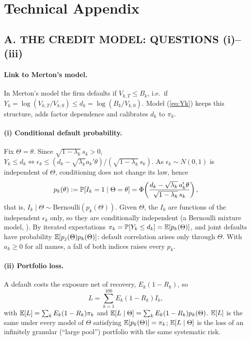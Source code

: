 \appendix
\section*{Technical Appendix}

\subsection*{A. THE CREDIT MODEL: QUESTIONS (i)--(iii)}
\paragraph{Link to Merton's model.}
In Merton's model \citep[Ch.~2]{DeGiorgi26} the firm defaults if $V_{k,T}\le B_k$, i.e.\ if $Y_k=\log(V_{k,T}/V_{k,0})\le d_k=\log(B_k/V_{k,0})$. Model (\ref{eq:Yk}) keeps this structure, adds factor dependence \citep[Sect.~8.3]{McNeil05} and calibrates $d_k$ to $\pi_k$.

\paragraph{(i) Conditional default probability.}
Fix $\Theta=\theta$. Since $\sqrt{1-\lambda_k}\,s_k>0$, $Y_k\le d_k\iff\epsilon_k\le(d_k-\sqrt{\lambda_k}a_k'\theta)/(\sqrt{1-\lambda_k}\,s_k)$. As $\epsilon_k\sim N(0,1)$ is independent of $\Theta$, conditioning does not change its law, hence
\begin{equation}
\label{eq:condpd}
p_k(\theta):=\P[I_k=1\mid\Theta=\theta]=\Phi\!\left(\frac{d_k-\sqrt{\lambda_k}\,a_k'\theta}{\sqrt{1-\lambda_k}\,s_k}\right),
\end{equation}
that is, $I_k\mid\Theta\sim\mathrm{Bernoulli}(p_k(\Theta))$.
Given $\Theta$, the $I_k$ are functions of the independent $\epsilon_k$ only, so they are conditionally independent (a Bernoulli mixture model, \citealp[Sect.~8.4]{McNeil05}). By iterated expectations $\pi_k=\mathbb{P}[Y_k\le d_k]=\mathbb{E}[p_k(\Theta)]$, and joint defaults have probability $\mathbb{E}[p_j(\Theta)p_k(\Theta)]$: default correlation arises only through $\Theta$. With $a_k\ge0$ for all names, a fall of both indices raises every $p_k$.

\paragraph{(ii) Portfolio loss.}
A default costs the exposure net of recovery, $E_k(1-R_k)$, so
\begin{equation}
\label{eq:loss}
L=\sum_{k=1}^{100}E_k(1-R_k)I_k,
\end{equation}
with $\mathbb{E}[L]=\sum_kE_k(1-R_k)\pi_k$ and $\mathbb{E}[L\mid\Theta]=\sum_kE_k(1-R_k)p_k(\Theta)$.
$\mathbb{E}[L]$ is the same under every model of $\Theta$ satisfying $\mathbb{E}[p_k(\Theta)]=\pi_k$; $\mathbb{E}[L\mid\Theta]$ is the loss of an infinitely granular (``large pool'') portfolio with the same systematic risk.

